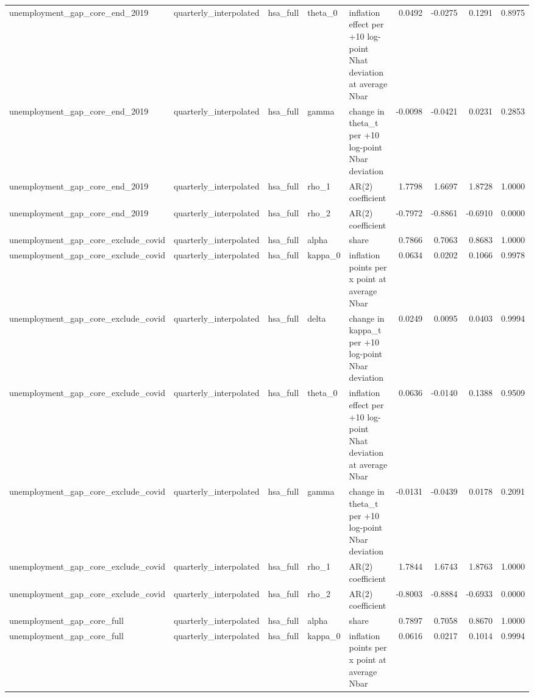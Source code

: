 \begin{tabular}{lllllrrrr}
unemployment\_gap\_core\_end\_2019 & quarterly\_interpolated & hsa\_full & theta\_0 & inflation effect per +10 log-point Nhat deviation at average Nbar & 0.0492 & -0.0275 & 0.1291 & 0.8975 \\
unemployment\_gap\_core\_end\_2019 & quarterly\_interpolated & hsa\_full & gamma & change in theta\_t per +10 log-point Nbar deviation & -0.0098 & -0.0421 & 0.0231 & 0.2853 \\
unemployment\_gap\_core\_end\_2019 & quarterly\_interpolated & hsa\_full & rho\_1 & AR(2) coefficient & 1.7798 & 1.6697 & 1.8728 & 1.0000 \\
unemployment\_gap\_core\_end\_2019 & quarterly\_interpolated & hsa\_full & rho\_2 & AR(2) coefficient & -0.7972 & -0.8861 & -0.6910 & 0.0000 \\
unemployment\_gap\_core\_exclude\_covid & quarterly\_interpolated & hsa\_full & alpha & share & 0.7866 & 0.7063 & 0.8683 & 1.0000 \\
unemployment\_gap\_core\_exclude\_covid & quarterly\_interpolated & hsa\_full & kappa\_0 & inflation points per x point at average Nbar & 0.0634 & 0.0202 & 0.1066 & 0.9978 \\
unemployment\_gap\_core\_exclude\_covid & quarterly\_interpolated & hsa\_full & delta & change in kappa\_t per +10 log-point Nbar deviation & 0.0249 & 0.0095 & 0.0403 & 0.9994 \\
unemployment\_gap\_core\_exclude\_covid & quarterly\_interpolated & hsa\_full & theta\_0 & inflation effect per +10 log-point Nhat deviation at average Nbar & 0.0636 & -0.0140 & 0.1388 & 0.9509 \\
unemployment\_gap\_core\_exclude\_covid & quarterly\_interpolated & hsa\_full & gamma & change in theta\_t per +10 log-point Nbar deviation & -0.0131 & -0.0439 & 0.0178 & 0.2091 \\
unemployment\_gap\_core\_exclude\_covid & quarterly\_interpolated & hsa\_full & rho\_1 & AR(2) coefficient & 1.7844 & 1.6743 & 1.8763 & 1.0000 \\
unemployment\_gap\_core\_exclude\_covid & quarterly\_interpolated & hsa\_full & rho\_2 & AR(2) coefficient & -0.8003 & -0.8884 & -0.6933 & 0.0000 \\
unemployment\_gap\_core\_full & quarterly\_interpolated & hsa\_full & alpha & share & 0.7897 & 0.7058 & 0.8670 & 1.0000 \\
unemployment\_gap\_core\_full & quarterly\_interpolated & hsa\_full & kappa\_0 & inflation points per x point at average Nbar & 0.0616 & 0.0217 & 0.1014 & 0.9994 \\

\end{tabular}
